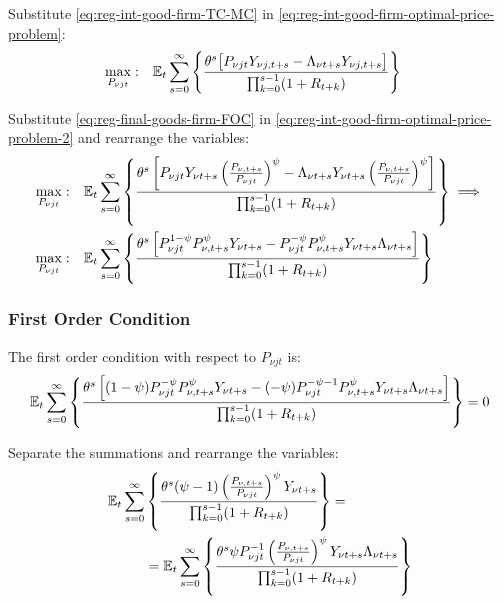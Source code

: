 \documentclass[
thesis.tex
]{subfiles}
\begin{document}

Substitute \ref{eq:reg-int-good-firm-TC-MC} in \ref{eq:reg-int-good-firm-optimal-price-problem}:
\begin{align}
	\label{eq:reg-int-good-firm-optimal-price-problem-2}
	\max_{P_{\nu jt}}: & \quad {\mathbb{E}_{t}} \sum_{s=0}^{\infty} \left\{ \frac{\theta^s \big[ P_{\nu jt} Y_{\nu j,t+s} - \Lambda_{\nu t+s} Y_{\nu j,t+s} \big]}{\prod_{k=0}^{s-1}(1+R_{t+k})} \right\}
\end{align}

Substitute \ref{eq:reg-final-goods-firm-FOC} in \ref{eq:reg-int-good-firm-optimal-price-problem-2} and rearrange the variables:
\begin{align}
	\max_{P_{\nu jt}}: & \quad {\mathbb{E}_{t}} \sum_{s=0}^{\infty} \left\{ \frac{\theta^s \left[ P_{\nu jt} Y_{\nu t+s} \left( \frac{P_{\nu, t+s}}{P_{\nu jt}} \right)^{\psi} - \Lambda_{\nu t+s} Y_{\nu t+s} \left( \frac{P_{\nu, t+s}}{P_{\nu jt}} \right)^{\psi} \right] }{\prod_{k=0}^{s-1}(1+R_{t+k})} \right\} \implies \nonumber 
	\\
	\max_{P_{\nu jt}}: & \quad {\mathbb{E}_{t}} \sum_{s=0}^{\infty} \left\{ \frac{\theta^s \left[ P_{\nu jt}^{1-\psi} P_{\nu, t+s}^{\psi} Y_{\nu t+s} - P_{\nu jt}^{-\psi} P_{\nu, t+s}^{\psi} Y_{\nu t+s} \Lambda_{\nu t+s} \right] }{\prod_{k=0}^{s-1}(1+R_{t+k})} \right\} \nonumber
\end{align}


\subsubsection*{First Order Condition}

The first order condition with respect to $P_{\nu jt}$ is:
\begin{align}
	& \quad {\mathbb{E}_{t}} \sum_{s=0}^{\infty} \left\{ \frac{\theta^s \left[ (1-\psi) P_{\nu jt}^{-\psi} P_{\nu, t+s}^{\psi} Y_{\nu t+s} - (-\psi) P_{\nu jt}^{-\psi-1} P_{\nu, t+s}^{\psi} Y_{\nu t+s} \Lambda_{\nu t+s} \right] }{\prod_{k=0}^{s-1}(1+R_{t+k})} \right\} = 0 \nonumber
\end{align}


Separate the summations and rearrange the variables:
\begin{align}
	\begin{split}
		{\mathbb{E}_{t}} \sum_{s=0}^{\infty} &\left\{ \frac{\theta^s (\psi-1) \left( \frac{P_{\nu, t+s}} {P_{\nu jt}} \right)^{\psi} Y_{\nu t+s}} {\prod_{k=0}^{s-1} (1+R_{t+k})} \right\} = \\
		&= {\mathbb{E}_{t}} \sum_{s=0}^{\infty} \left\{ \frac{\theta^s \psi P_{\nu jt}^{-1} \left( \frac{P_{\nu, t+s}} {P_{\nu jt}} \right)^{\psi} Y_{\nu t+s} \Lambda_{\nu t+s} }{\prod_{k=0}^{s-1}(1+R_{t+k})} \right\} \label{eq:reg-int-good-firm-optimal-price-FOC}
	\end{split}
\end{align}
\end{document}
